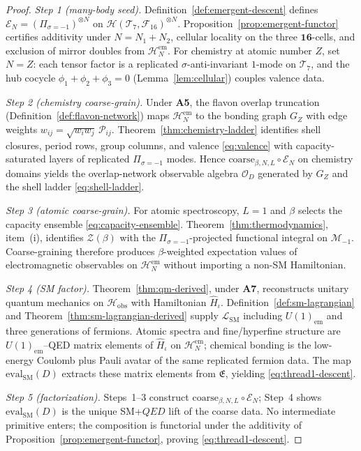 \begin{proof}
\emph{Step 1 (many-body seed).}
Definition~\ref{def:emergent-descent} defines
$\mathcal{E}_N=(\Pi_{\sigma=-1})^{\otimes N}$ on
$\mathcal{H}(\mathcal{T}_7,\mathcal{F}_{16})^{\otimes N}$. Proposition~\ref{prop:emergent-functor}
certifies additivity under $N=N_1+N_2$, cellular locality on the three
$\mathbf{16}$-cells, and exclusion of mirror doubles from
$\mathcal{H}_N^{\mathrm{em}}$. For chemistry at atomic number $Z$, set
$N=Z$: each tensor factor is a replicated $\sigma$-anti-invariant $1$-mode on
$\mathcal{T}_7$, and the hub cocycle $\phi_1+\phi_2+\phi_3=0$
(Lemma~\ref{lem:cellular}) couples valence data.

\emph{Step 2 (chemistry coarse-grain).}
Under \textbf{A5}, the flavon overlap truncation
(Definition~\ref{def:flavon-network}) maps
$\mathcal{H}_N^{\mathrm{em}}$ to the bonding graph $G_Z$ with edge weights
$w_{ij}=\sqrt{w_iw_j}\,\mathcal{P}_{ij}$. Theorem~\ref{thm:chemistry-ladder}
identifies shell closures, period rows, group columns, and valence
\eqref{eq:valence} with capacity-saturated layers of replicated
$\Pi_{\sigma=-1}$ modes. Hence
$\mathrm{coarse}_{\beta,N,L}\circ\mathcal{E}_N$ on chemistry domains yields
the overlap-network observable algebra $\mathcal{O}_D$ generated by $G_Z$ and
the shell ladder \eqref{eq:shell-ladder}.

\emph{Step 3 (atomic coarse-grain).}
For atomic spectroscopy, $L=1$ and $\beta$ selects the capacity ensemble
\eqref{eq:capacity-ensemble}. Theorem~\ref{thm:thermodynamics}, item~(i),
identifies $\mathcal{Z}(\beta)$ with the $\Pi_{\sigma=-1}$-projected
functional integral on $\mathcal{M}_{-1}$. Coarse-graining therefore
produces $\beta$-weighted expectation values of electromagnetic observables on
$\mathcal{H}_N^{\mathrm{em}}$ without importing a non-SM Hamiltonian.

\emph{Step 4 (SM factor).}
Theorem~\ref{thm:qm-derived}, under \textbf{A7}, reconstructs unitary quantum
mechanics on $\mathcal{H}_{\mathrm{obs}}$ with Hamiltonian $\hat H_\iota$.
Definition~\ref{def:sm-lagrangian} and Theorem~\ref{thm:sm-lagrangian-derived}
supply $\mathcal{L}_{\mathrm{SM}}$ including $U(1)_{\mathrm{em}}$ and three
generations of fermions. Atomic spectra and fine/hyperfine structure are
$U(1)_{\mathrm{em}}$--QED matrix elements of $\hat H_\iota$ on
$\mathcal{H}_N^{\mathrm{em}}$; chemical bonding is the low-energy Coulomb plus
Pauli avatar of the same replicated fermion data. The map
$\mathrm{eval}_{\mathrm{SM}}(D)$ extracts these matrix elements from
$\mathfrak{E}$, yielding \eqref{eq:thread1-descent}.

\emph{Step 5 (factorization).}
Steps~1--3 construct
$\mathrm{coarse}_{\beta,N,L}\circ\mathcal{E}_N$; Step~4 shows
$\mathrm{eval}_{\mathrm{SM}}(D)$ is the unique SM+$QED$ lift of the coarse
data. No intermediate primitive enters; the composition is functorial under
the additivity of Proposition~\ref{prop:emergent-functor}, proving
\eqref{eq:thread1-descent}.
\end{proof}

